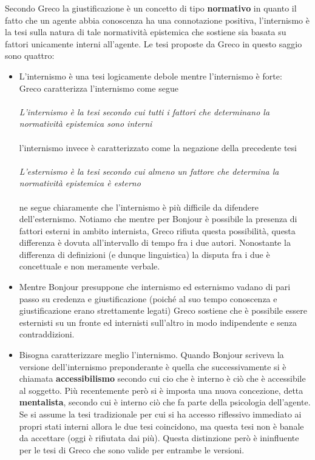 \documentclass[10pt,a4paper]{article}
\begin{document}
Secondo Greco la giustificazione è un concetto di tipo \textbf{normativo} in quanto il fatto che un agente abbia conoscenza ha una connotazione positiva, l'internismo è la tesi sulla natura di tale normatività epistemica che sostiene sia basata su fattori unicamente interni all'agente. Le tesi proposte da Greco in questo saggio sono quattro:
\begin{itemize}
	\item L'internismo è una tesi logicamente debole mentre l'internismo è forte:\\
	Greco caratterizza l'internismo come segue\\\\
	\textit{L'internismo è la tesi secondo cui tutti i fattori che determinano la normatività epistemica sono interni}\\\\
	l'internismo invece è caratterizzato come la negazione della precedente tesi\\\\
	\textit{L'esternismo è la tesi secondo cui almeno un fattore che determina la normatività epistemica è esterno}\\\\
	ne segue chiaramente  che l'internismo è più difficile da difendere dell'esternismo. Notiamo che mentre per Bonjour è possibile la presenza di fattori esterni in ambito internista, Greco rifiuta questa possibilità, questa differenza è dovuta all'intervallo di tempo fra i due autori. Nonostante la differenza di definizioni (e dunque linguistica) la disputa fra i due è concettuale e non meramente verbale.  
	\item Mentre Bonjour presuppone che internismo ed esternismo vadano di pari passo su credenza e giustificazione (poiché al suo tempo conoscenza e giustificazione erano strettamente legati) Greco sostiene che è possibile essere esternisti su un fronte ed internisti sull'altro in modo indipendente e senza contraddizioni. 
	\item Bisogna caratterizzare meglio l'internismo. Quando Bonjour scriveva la versione dell'internismo preponderante è quella che successivamente si è chiamata \textbf{accessibilismo} secondo cui cio che è interno è ciò che è accessibile al soggetto. Più recentemente però si è imposta una nuova concezione, detta \textbf{mentalista}, secondo cui è interno ciò che fa parte della psicologia dell'agente. Se si assume la tesi tradizionale per cui si ha accesso riflessivo immediato ai propri stati interni allora le due tesi coincidono, ma questa tesi non è banale da accettare (oggi è rifiutata dai più). Questa distinzione però è ininfluente per le tesi di Greco che sono valide per entrambe le versioni. 

\end{itemize}
\end{document}
